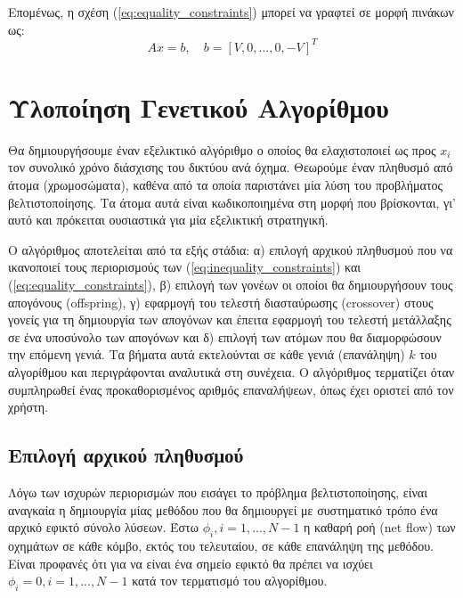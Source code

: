 \documentclass[a4paper,12pt]{article}
\begin{document}
Επομένως, η σχέση (\ref{eq:equality_constraints}) μπορεί να γραφτεί σε μορφή πινάκων ως:
\begin{equation}
    A x = b, \quad b = [V,0,...,0,-V]^T
    \label{eq:equality_constraints_matrix_form}
\end{equation}

\newpage

\section{Υλοποίηση Γενετικού Αλγορίθμου}

Θα δημιουργήσουμε έναν εξελικτικό αλγόριθμο ο οποίος θα ελαχιστοποιεί ως προς $x_i$ τον συνολικό χρόνο διάσχισης 
του δικτύου ανά όχημα. Θεωρούμε έναν πληθυσμό από άτομα (χρωμοσώματα), καθένα από τα οποία παριστάνει μία λύση του
προβλήματος βελτιστοποίησης. Τα άτομα αυτά είναι κωδικοποιημένα στη μορφή που βρίσκονται, γι' αυτό και πρόκειται 
ουσιαστικά για μία εξελικτική στρατηγική. 

Ο αλγόριθμος αποτελείται από τα εξής στάδια: 
α) επιλογή αρχικού πληθυσμού που να ικανοποιεί τους περιορισμούς των (\ref{eq:inequality_constraints}) και 
(\ref{eq:equality_constraints}),
β) επιλογή των γονέων οι οποίοι θα δημιουργήσουν τους απογόνους
(offspring),
γ) εφαρμογή του τελεστή διασταύρωσης (crossover) στους γονείς 
για τη δημιουργία των απογόνων και έπειτα εφαρμογή του τελεστή μετάλλαξης σε ένα υποσύνολο των απογόνων και
δ) επιλογή των ατόμων που θα διαμορφώσουν την επόμενη γενιά. 
Τα βήματα αυτά εκτελούνται σε κάθε γενιά (επανάληψη) $k$ του αλγορίθμου και περιγράφονται αναλυτικά στη συνέχεια.
Ο αλγόριθμος τερματίζει όταν συμπληρωθεί ένας προκαθορισμένος αριθμός επαναλήψεων, όπως έχει οριστεί από τον χρήστη.

\subsection{Επιλογή αρχικού πληθυσμού}
Λόγω των ισχυρών περιορισμών που εισάγει το πρόβλημα βελτιστοποίησης, είναι αναγκαία η δημιουργία μίας μεθόδου
που θα δημιουργεί με συστηματικό τρόπο ένα αρχικό εφικτό σύνολο λύσεων. Έστω $\phi_i, i=1,...,N-1$ η καθαρή ροή 
(net flow) των οχημάτων σε κάθε κόμβο, εκτός του τελευταίου, 
σε κάθε επανάληψη της μεθόδου. Είναι προφανές ότι για να είναι ένα σημείο εφικτό θα πρέπει να ισχύει 
$\phi_i = 0, i=1,...,N-1$ κατά τον τερματισμό του αλγορίθμου.
\end{document}
